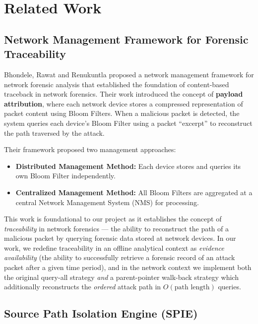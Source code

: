 \documentclass[12pt, a4paper]{report}
\begin{document}
\chapter{Related Work}

\section{Network Management Framework for Forensic Traceability}

Bhondele, Rawat and Renukuntla \cite{shesha2015} proposed a network
management framework for network forensic analysis that established the
foundation of content-based traceback in network forensics. Their work
introduced the concept of \textbf{payload attribution}, where each network
device stores a compressed representation of packet content using Bloom
Filters. When a malicious packet is detected, the system queries each
device's Bloom Filter using a packet ``excerpt'' to reconstruct the path
traversed by the attack.

Their framework proposed two management approaches:

\begin{itemize}[leftmargin=*]
  \item \textbf{Distributed Management Method:} Each device stores and
  queries its own Bloom Filter independently.
  \item \textbf{Centralized Management Method:} All Bloom Filters are
  aggregated at a central Network Management System (NMS) for processing.
\end{itemize}

This work is foundational to our project as it establishes the concept of
\textit{traceability} in network forensics --- the ability to reconstruct
the path of a malicious packet by querying forensic data stored at network
devices. In our work, we redefine traceability in an offline analytical
context as \textit{evidence availability} (the ability to successfully
retrieve a forensic record of an attack packet after a given time period),
and in the network context we implement both the original query-all
strategy \textit{and} a parent-pointer walk-back strategy which additionally
reconstructs the \textit{ordered} attack path in $O(\text{path length})$
queries.

\section{Source Path Isolation Engine (SPIE)}
\end{document}
